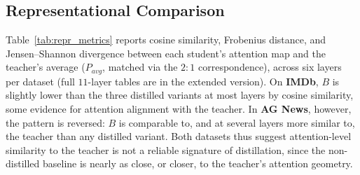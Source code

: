 \documentclass[conference]{IEEEtran}
\begin{document}
\subsection{Representational Comparison}\label{sec:repr-comparison}

Table~\ref{tab:repr_metrics} reports cosine similarity, Frobenius distance, and Jensen--Shannon divergence between each student's attention map and the teacher's average ($P_{avg}$, matched via the $2{:}1$ correspondence), across six layers per dataset (full $11$-layer tables are in the extended version). On \textbf{IMDb}, $B$ is slightly lower than the three distilled variants at most layers by cosine similarity, some evidence for attention alignment with the teacher. In \textbf{AG News}, however, the pattern is reversed: $B$ is comparable to, and at several layers more similar to, the teacher than any distilled variant. Both datasets thus suggest attention-level similarity to the teacher is not a reliable signature of distillation, since the non-distilled baseline is nearly as close, or closer, to the teacher's attention geometry.
\end{document}
